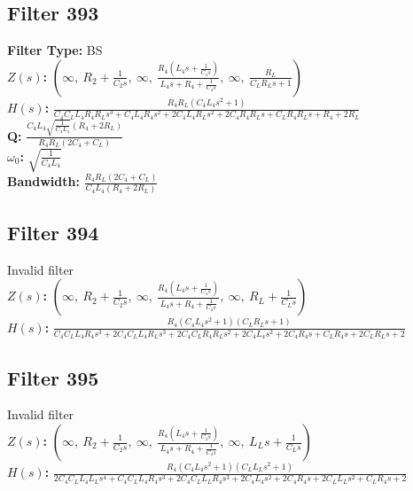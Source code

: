 \documentclass{article}
\begin{document}
\subsection*{Filter 393}
\textbf{Filter Type:} BS \\ 
\textbf{$Z(s)$:} $\left( \infty, \  R_{2} + \frac{1}{C_{2} s}, \  \infty, \  \frac{R_{4} \left(L_{4} s + \frac{1}{C_{4} s}\right)}{L_{4} s + R_{4} + \frac{1}{C_{4} s}}, \  \infty, \  \frac{R_{L}}{C_{L} R_{L} s + 1}\right)$ \\ 
\textbf{$H(s)$:} $\frac{R_{4} R_{L} \left(C_{4} L_{4} s^{2} + 1\right)}{C_{4} C_{L} L_{4} R_{4} R_{L} s^{3} + C_{4} L_{4} R_{4} s^{2} + 2 C_{4} L_{4} R_{L} s^{2} + 2 C_{4} R_{4} R_{L} s + C_{L} R_{4} R_{L} s + R_{4} + 2 R_{L}}$ \\ 
\textbf{Q:} $\frac{C_{4} L_{4} \sqrt{\frac{1}{C_{4} L_{4}}} \left(R_{4} + 2 R_{L}\right)}{R_{4} R_{L} \left(2 C_{4} + C_{L}\right)}$ \\ 
\textbf{$\omega_0$:} $\sqrt{\frac{1}{C_{4} L_{4}}}$ \\ 
\textbf{Bandwidth:} $\frac{R_{4} R_{L} \left(2 C_{4} + C_{L}\right)}{C_{4} L_{4} \left(R_{4} + 2 R_{L}\right)}$ \\ 
\subsection*{Filter 394}
Invalid filter \\ 
\textbf{$Z(s)$:} $\left( \infty, \  R_{2} + \frac{1}{C_{2} s}, \  \infty, \  \frac{R_{4} \left(L_{4} s + \frac{1}{C_{4} s}\right)}{L_{4} s + R_{4} + \frac{1}{C_{4} s}}, \  \infty, \  R_{L} + \frac{1}{C_{L} s}\right)$ \\ 
\textbf{$H(s)$:} $\frac{R_{4} \left(C_{4} L_{4} s^{2} + 1\right) \left(C_{L} R_{L} s + 1\right)}{C_{4} C_{L} L_{4} R_{4} s^{3} + 2 C_{4} C_{L} L_{4} R_{L} s^{3} + 2 C_{4} C_{L} R_{4} R_{L} s^{2} + 2 C_{4} L_{4} s^{2} + 2 C_{4} R_{4} s + C_{L} R_{4} s + 2 C_{L} R_{L} s + 2}$ \\ 
\subsection*{Filter 395}
Invalid filter \\ 
\textbf{$Z(s)$:} $\left( \infty, \  R_{2} + \frac{1}{C_{2} s}, \  \infty, \  \frac{R_{4} \left(L_{4} s + \frac{1}{C_{4} s}\right)}{L_{4} s + R_{4} + \frac{1}{C_{4} s}}, \  \infty, \  L_{L} s + \frac{1}{C_{L} s}\right)$ \\ 
\textbf{$H(s)$:} $\frac{R_{4} \left(C_{4} L_{4} s^{2} + 1\right) \left(C_{L} L_{L} s^{2} + 1\right)}{2 C_{4} C_{L} L_{4} L_{L} s^{4} + C_{4} C_{L} L_{4} R_{4} s^{3} + 2 C_{4} C_{L} L_{L} R_{4} s^{3} + 2 C_{4} L_{4} s^{2} + 2 C_{4} R_{4} s + 2 C_{L} L_{L} s^{2} + C_{L} R_{4} s + 2}$ \\ 
\end{document}
